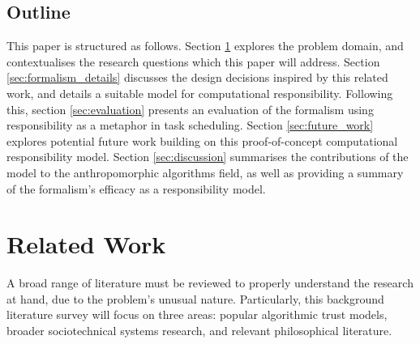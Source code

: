 \subsection{Outline}

This paper is structured as follows. Section \ref{sec:related_work} explores the problem domain, and contextualises the research questions which this paper will address. Section \ref{sec:formalism_details} discusses the design decisions inspired by this related work, and details a suitable model for computational responsibility. Following this, section \ref{sec:evaluation} presents an evaluation of the formalism using responsibility as a metaphor in task scheduling.  Section \ref{sec:future_work} explores potential future work building on this proof-of-concept computational responsibility model. Section \ref{sec:discussion} summarises the contributions of the model to the anthropomorphic algorithms field, as well as providing a summary of the formalism's efficacy as a responsibility model.\par
% 
% 
% 
% 

\section{Related Work}\label{sec:related_work}
A broad range of literature must be reviewed to properly understand the research at hand, due to the problem's unusual nature. Particularly, this background literature survey will focus on three areas: popular algorithmic trust models, broader sociotechnical systems research, and relevant philosophical literature.\par

